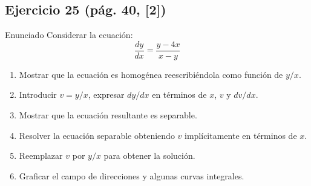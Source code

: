 \subsection*{Ejercicio 25 \quad\normalfont\small(pág. 40, [2])}
\begin{enunciado}{Enunciado}
    Considerar la ecuación:
    \[
        \frac{dy}{dx} = \frac{y - 4x}{x - y} \tag{29}
    \]
    \begin{enumerate}[label=\textbf{\alph*.}]
        \item Mostrar que la ecuación es homogénea reescribiéndola como función de $y/x$.
        \item Introducir $v = y/x$, expresar $dy/dx$ en términos de $x$, $v$ y $dv/dx$.
        \item Mostrar que la ecuación resultante es separable.
        \item Resolver la ecuación separable obteniendo $v$ implícitamente en términos de $x$.
        \item Reemplazar $v$ por $y/x$ para obtener la solución.
        \item Graficar el campo de direcciones y algunas curvas integrales.
    \end{enumerate}
\end{enunciado}

